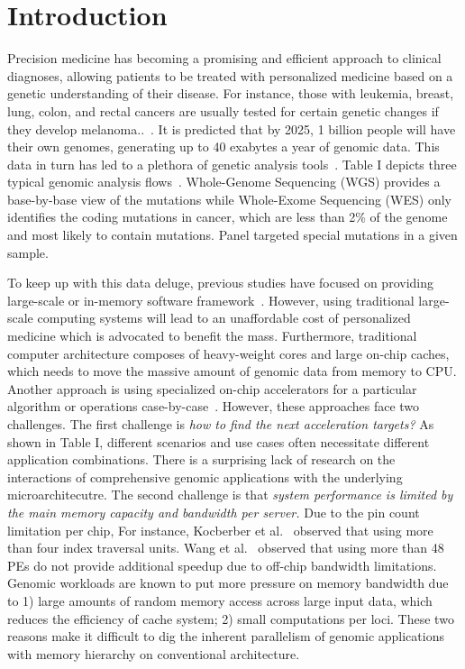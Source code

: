 \section{Introduction}


Precision medicine has becoming a promising and efficient approach to clinical diagnoses, allowing patients to be treated with personalized medicine based on a genetic understanding of their disease. For instance, those with leukemia, breast, lung, colon, and rectal cancers are usually tested for certain genetic changes if they develop melanoma..~\cite{shendure2008next,chang2016smem,cong2017aim}. It is predicted that by 2025, 1 billion people will have their own genomes, generating up to 40 exabytes a year of genomic data. This data in turn has led to a plethora of genetic analysis tools~\cite{li2013aligning,li2009sequence,McKenna01092010,picard,SMALT}. Table I depicts three typical genomic analysis flows~\cite{hiseq}. Whole-Genome Sequencing (WGS) provides a base-by-base view of the mutations while Whole-Exome Sequencing (WES) only identifies the coding mutations in cancer, which are less than 2\% of the genome and most likely to contain mutations. Panel targeted special mutations in a given sample.

To keep up with this data deluge, previous studies have focused on providing large-scale or in-memory software framework~\cite{HugeSeq,Massie:EECS-2013-207}. However, using traditional large-scale computing systems will lead to an unaffordable cost of personalized medicine which is advocated to benefit the mass. Furthermore, traditional computer architecture composes of heavy-weight cores and large on-chip caches, which needs to move the massive amount of genomic data from memory to CPU. Another approach is using specialized on-chip accelerators for a particular algorithm or operations case-by-case~\cite{ahmed2015heterogeneous, houtgast2016gpu, liu2012evaluation,chang2016smem, fernandez2011string}. However, these approaches face two challenges. The first challenge is \textit{how to find the next acceleration targets?} As shown in Table I, different scenarios and use cases often necessitate different application combinations. There is a surprising lack of research on the interactions of comprehensive genomic applications with the underlying microarchitecutre. The second challenge is that \textit{system performance is limited by the main memory capacity and bandwidth per server.} Due to the pin count limitation per chip, For instance, Kocberber et al.~\cite{Kocberber:2013bb} observed that using more than four index traversal units. Wang et al.~\cite{yuanrong} observed that using more than 48 PEs do not provide additional speedup due to off-chip bandwidth limitations. Genomic workloads are known to put more pressure on memory bandwidth due to 1) large amounts of random memory access across large input data, which reduces the efficiency of cache system; 2) small computations per loci. These two reasons make it difficult to dig the inherent parallelism of genomic applications with memory hierarchy on conventional architecture.

